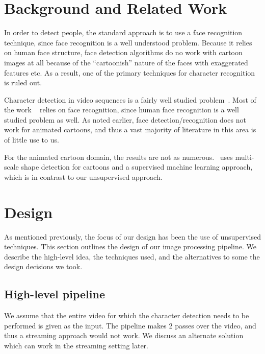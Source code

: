 \documentclass[10pt,twocolumn,letterpaper]{article}
\begin{document}
\section{Background and Related Work}

In order to detect people, the standard approach is to use a face
recognition technique, since face recognition is a well understood
problem. Because it relies on human face structure, face detection
algorithms do no work with cartoon images at all because of the
``cartoonish'' nature of the faces with exaggerated features etc. As a
result, one of the primary techniques for character recognition is
ruled out. 

Character detection in video sequences is a fairly well studied
problem~\cite{everingham2009taking,
  satoh1999name,snoek2008concept,sivic2005person}. Most of the work
~\cite{arandjelovic2005automatic} relies on face recognition, since
human face recognition is a well studied problem as well. As noted
earlier, face detection/recognition does not work for animated
cartoons, and thus a vast majority of literature in this area is of
little use to us.

For the animated cartoon domain, the results are not as
numerous.~\cite{zhang20132} uses multi-scale shape detection for
cartoons and a supervised machine learning approach, which is in
contrast to our unsupervised approach.



\section{Design}
As mentioned previously, the focus of our design has been the use of
unsupervised techniques. This section outlines the design of our image
processing pipeline. We describe the high-level idea, the techniques
used, and the alternatives to some the design decisions we took.

\subsection{High-level pipeline}
We assume that the entire video for which the character detection
needs to be performed is given as the input. The pipeline makes 2
passes over the video, and thus a streaming approach would not
work. We discuss an alternate solution which can work in the streaming
setting later.
\end{document}
